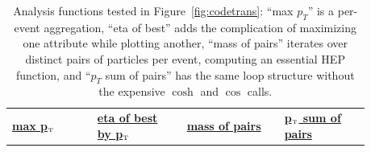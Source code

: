\documentclass[a4paper]{jpconf}
\begin{document}
\begin{table}
\caption{\label{tab:code} Analysis functions tested in Figure~\ref{fig:codetrans}: ``max $p_T$'' is a per-event aggregation, ``eta of best'' adds the complication of maximizing one attribute while plotting another, ``mass of pairs'' iterates over distinct pairs of particles per event, computing an essential HEP function, and ``$p_T$ sum of pairs'' has the same loop structure without the expensive $\cosh$ and $\cos$ calls.}

\begin{center}
\begin{tabular}{p{0.21\linewidth} p{0.22\linewidth} p{0.24\linewidth} p{0.21\linewidth}}
\underline{{\small\bf max p$_{\mbox{\tiny T}}$}}
\begin{minipage}{\linewidth}\scriptsize

\end{minipage} &
\underline{{\small\bf eta of best by p$_{\mbox{\tiny T}}$}}
\begin{minipage}{\linewidth}\scriptsize

\end{minipage} &
\underline{{\small\bf mass of pairs}}
\begin{minipage}{\linewidth}\scriptsize

\end{minipage} &
\underline{{\small\bf p$_{\mbox{\tiny T}}$ sum of pairs}}
\begin{minipage}{\linewidth}\scriptsize

\end{minipage}
\end{tabular}
\end{center}
\vspace{-0.75 cm}
\end{table}
\end{document}
